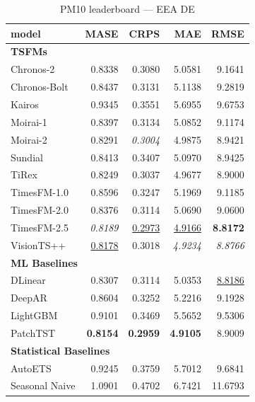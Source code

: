 \begin{table}[H]
\caption{PM10 leaderboard --- EEA DE}
\centering
\begin{small}
\begin{tabular}{lrrrr}
\toprule
model & MASE & CRPS & MAE & RMSE \\
\midrule
\multicolumn{5}{l}{\textbf{TSFMs}} \\
Chronos-2 & 0.8338 & 0.3080 & 5.0581 & 9.1641 \\
Chronos-Bolt & 0.8437 & 0.3131 & 5.1138 & 9.2819 \\
Kairos & 0.9345 & 0.3551 & 5.6955 & 9.6753 \\
Moirai-1 & 0.8397 & 0.3134 & 5.0852 & 9.1174 \\
Moirai-2 & 0.8291 & \textit{0.3004} & 4.9875 & 8.9421 \\
Sundial & 0.8413 & 0.3407 & 5.0970 & 8.9425 \\
TiRex & 0.8249 & 0.3037 & 4.9677 & 8.9000 \\
TimesFM-1.0 & 0.8596 & 0.3247 & 5.1969 & 9.1185 \\
TimesFM-2.0 & 0.8376 & 0.3114 & 5.0690 & 9.0600 \\
TimesFM-2.5 & \textit{0.8189} & \underline{0.2973} & \underline{4.9166} & \textbf{8.8172} \\
VisionTS++ & \underline{0.8178} & 0.3018 & \textit{4.9234} & \textit{8.8766} \\
\midrule
\multicolumn{5}{l}{\textbf{ML Baselines}} \\
DLinear & 0.8307 & 0.3114 & 5.0353 & \underline{8.8186} \\
DeepAR & 0.8604 & 0.3252 & 5.2216 & 9.1928 \\
LightGBM & 0.9101 & 0.3469 & 5.5652 & 9.5306 \\
PatchTST & \textbf{0.8154} & \textbf{0.2959} & \textbf{4.9105} & 8.9009 \\
\midrule
\multicolumn{5}{l}{\textbf{Statistical Baselines}} \\
AutoETS & 0.9245 & 0.3759 & 5.7012 & 9.6841 \\
Seasonal Naive & 1.0901 & 0.4702 & 6.7421 & 11.6793 \\
\bottomrule
\end{tabular}
\end{small}
\end{table}